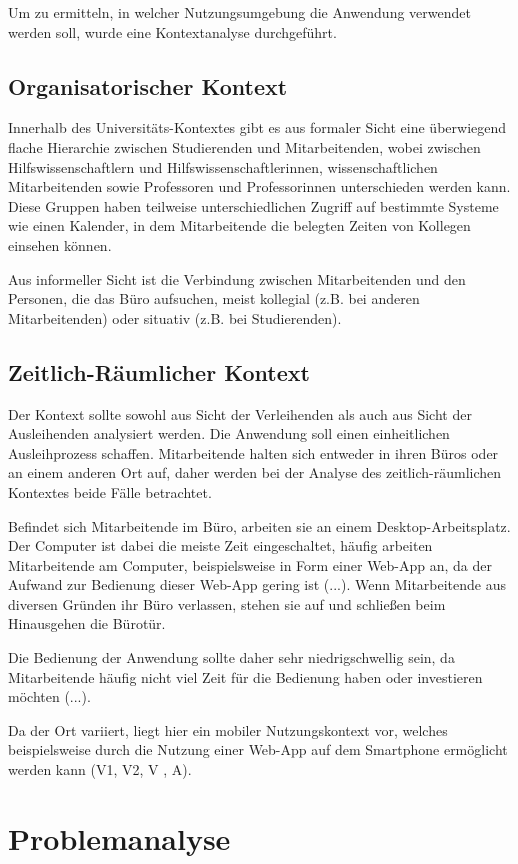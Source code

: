Um zu ermitteln, in welcher Nutzungsumgebung die Anwendung verwendet werden
soll, wurde eine Kontextanalyse durchgeführt.

\subsection*{Organisatorischer Kontext}
Innerhalb des Universitäts-Kontextes gibt es aus formaler Sicht eine überwiegend
flache Hierarchie zwischen Studierenden und Mitarbeitenden, wobei zwischen
Hilfswissenschaftlern und Hilfswissenschaftlerinnen, wissenschaftlichen
Mitarbeitenden sowie Professoren und Professorinnen unterschieden werden kann.
Diese Gruppen haben teilweise unterschiedlichen Zugriff auf bestimmte Systeme
wie einen Kalender, in dem Mitarbeitende die belegten Zeiten von Kollegen
einsehen können.

Aus informeller Sicht ist die Verbindung zwischen Mitarbeitenden und den
Personen, die das Büro aufsuchen, meist kollegial (z.B. bei anderen
Mitarbeitenden) oder situativ (z.B. bei Studierenden).

\subsection*{Zeitlich-Räumlicher Kontext}
\label{section:zeit}
Der Kontext sollte sowohl aus Sicht der Verleihenden als auch aus Sicht der
Ausleihenden analysiert werden. Die Anwendung soll einen einheitlichen Ausleihprozess schaffen.
Mitarbeitende halten sich entweder in ihren Büros oder an
einem anderen Ort auf, daher werden bei der Analyse des zeitlich-räumlichen
Kontextes beide Fälle betrachtet.

Befindet sich Mitarbeitende im Büro, arbeiten sie an einem Desktop-Arbeitsplatz.
Der Computer ist dabei die meiste Zeit eingeschaltet, häufig arbeiten
Mitarbeitende am Computer, beispielsweise in Form einer Web-App an, da der
Aufwand zur Bedienung dieser Web-App gering ist (...). Wenn Mitarbeitende aus
diversen Gründen ihr Büro verlassen, stehen sie auf und schließen beim
Hinausgehen die Bürotür.

Die Bedienung der Anwendung sollte daher sehr
niedrigschwellig sein, da Mitarbeitende häufig nicht viel Zeit für die Bedienung
haben oder investieren möchten (...).

Da der Ort variiert, liegt hier ein mobiler Nutzungskontext vor, welches beispielsweise
durch die Nutzung einer Web-App auf dem Smartphone ermöglicht werden kann (V1, V2, V , A).


\section{Problemanalyse}
\label{section:iststand}

